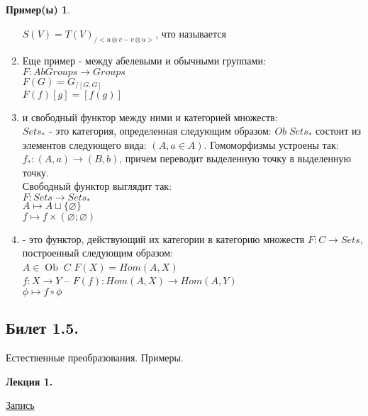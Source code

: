 \documentclass[a4paper]{article}
\newcommand{\mybox}{%
    \collectbox{%
        \setlength{\fboxsep}{1pt}%
        \fbox{\BOXCONTENT}%
    }%
}
\theoremstyle{indented}
\theoremstyle{definition}
\newtheorem{exl}{Пример(ы)}
\theoremstyle{remark}
\DeclareMathOperator{\ra}{\rightarrow}
\DeclareMathOperator{\Ob}{Ob}
\begin{document}
\begin{exl}
\begin{enumerate}
        $S(V) = T(V)_{/<u \otimes v - v \otimes u>}$, что называется 
        \item Еще пример - между абелевыми и обычными группами: \\
        $F: AbGroups \ra Groups$ \\
        $F(G) = G_{/[G, G]}$ \\
        $F(f)[g] = [f(g)]$
        \item {} и свободный функтор между ними и категорией множеств: \\
        $Sets_*$ - это категория, определенная следующим образом: $Ob\;Sets_*$ состоит из элементов следующего вида: $(A, a \in A)$. Гомоморфизмы устроены так: $f_*: (A, a) \ra (B, b)$, причем переводит выделенную точку в выделенную точку. \\
        Свободный функтор выглядит так: \\
        $F: Sets \ra Sets_*$ \\
        $A \mapsto A \sqcup \{\varnothing\}$ \\
        $f \mapsto f \times (\varnothing; \varnothing)$
        \item {} - это функтор, действующий их категории в категорию множеств $F: C \ra Sets$, построенный следующим образом: \\
        $A\in\Ob\;C$ $F(X) = Hom(A, X)$ \\
        $f: X \ra Y$ -- $F(f): Hom(A, X) \ra Hom(A, Y)$ \\
        $\phi \mapsto f \circ \phi$
    \end{enumerate}
\end{exl}



\newpage

\subsection{Билет 1.5.}

Естественные преобразования. Примеры.  

\hrulefill

\textbf{Лекция 1.} 

\begin{flushright}
    \mybox{
        \href{https://disk.yandex.ru/d/knoQ44wLmGDwwQ/2021-2022%20учебный%20год%20(осенний%20семестр)/2%20курс/Теоретическая%20информатика/Теор%20информатика%2C%20лекция%2C%2001.09.2021.mp4}{Запись}
    }
\end{flushright}
\end{document}
